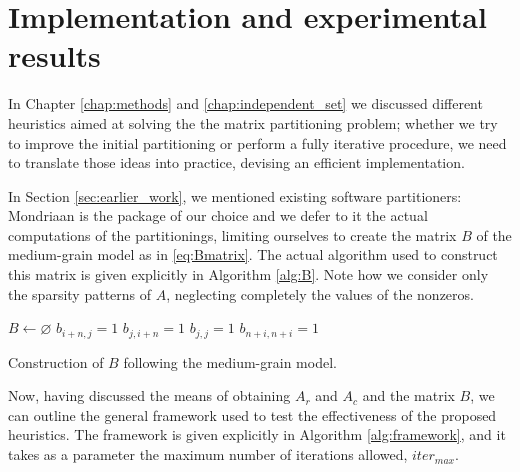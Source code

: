\chapter{Implementation and experimental results} \label{chap:experimental_results}

In Chapter \ref{chap:methods} and \ref{chap:independent_set} we discussed different heuristics aimed at solving the the matrix partitioning problem; whether we try to improve the initial partitioning or perform a fully iterative procedure, we need to translate those ideas into practice, devising an efficient implementation.

In Section \ref{sec:earlier_work}, we mentioned existing software partitioners: Mondriaan \cite{mondriaan} is the package of our choice and we defer to it the actual computations of the partitionings, limiting ourselves to create the matrix $B$ of the medium-grain model as in \eqref{eq:Bmatrix}. The actual algorithm used to construct this matrix is given explicitly in Algorithm \ref{alg:B}. Note how we consider only the sparsity patterns of $A$, neglecting completely the values of the nonzeros.

\begin{algorithm}[h]
	\begin{algorithmic}
		\State $B \gets \varnothing$
		 
		\State $b_{i+n,j} = 1$
		\EndFor
		 
		\State $b_{j,i+n} = 1$
		\EndFor
		 
		\State $b_{j,j} = 1$
		\EndIf
		\EndFor
		 
		\State $b_{n+i,n+i} = 1$
		\EndIf
		\EndFor
	\end{algorithmic}
	\caption{Construction of $B$ following the medium-grain model.} \label{alg:B}
\end{algorithm}

Now, having discussed the means of obtaining $A_r$ and $A_c$ and the matrix $B$, we can outline the general framework used to test the effectiveness of the proposed heuristics. The framework is given explicitly in Algorithm \ref{alg:framework}, and it takes as a parameter the maximum number of iterations allowed, $iter_{max}$.  

